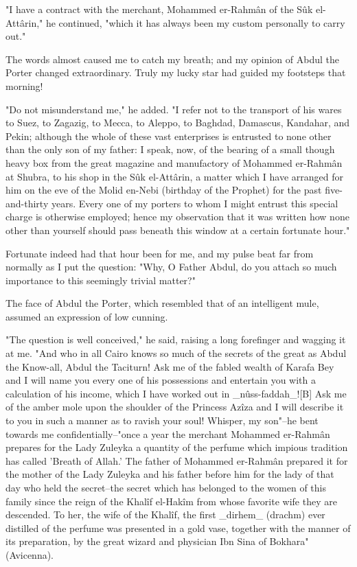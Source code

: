 "I have a contract with the merchant, Mohammed er-Rahmân of the Sûk
el-Attârin," he continued, "which it has always been my custom
personally to carry out."

The words almost caused me to catch my breath; and my opinion of Abdul
the Porter changed extraordinary. Truly my lucky star had guided my
footsteps that morning!

"Do not misunderstand me," he added. "I refer not to the transport of
his wares to Suez, to Zagazig, to Mecca, to Aleppo, to Baghdad,
Damascus, Kandahar, and Pekin; although the whole of these vast
enterprises is entrusted to none other than the only son of my father:
I speak, now, of the bearing of a small though heavy box from the
great magazine and manufactory of Mohammed er-Rahmân at Shubra, to his
shop in the Sûk el-Attârin, a matter which I have arranged for him on
the eve of the Molid en-Nebi (birthday of the Prophet) for the past
five-and-thirty years. Every one of my porters to whom I might entrust
this special charge is otherwise employed; hence my observation that
it was written how none other than yourself should pass beneath this
window at a certain fortunate hour."

Fortunate indeed had that hour been for me, and my pulse beat far from
normally as I put the question: "Why, O Father Abdul, do you attach so
much importance to this seemingly trivial matter?"

The face of Abdul the Porter, which resembled that of an intelligent
mule, assumed an expression of low cunning.

"The question is well conceived," he said, raising a long forefinger
and wagging it at me. "And who in all Cairo knows so much of the
secrets of the great as Abdul the Know-all, Abdul the Taciturn! Ask
me of the fabled wealth of Karafa Bey and I will name you every one
of his possessions and entertain you with a calculation of his income,
which I have worked out in _nûss-faddah_![B] Ask me of the amber mole
upon the shoulder of the Princess Azîza and I will describe it to you
in such a manner as to ravish your soul! Whisper, my son"--he bent
towards me confidentially--"once a year the merchant Mohammed
er-Rahmân prepares for the Lady Zuleyka a quantity of the perfume
which impious tradition has called 'Breath of Allah.' The father of
Mohammed er-Rahmân prepared it for the mother of the Lady Zuleyka and
his father before him for the lady of that day who held the
secret--the secret which has belonged to the women of this family
since the reign of the Khalîf el-Hakîm from whose favorite wife they
are descended. To her, the wife of the Khalîf, the first _dirhem_
(drachm) ever distilled of the perfume was presented in a gold vase,
together with the manner of its preparation, by the great wizard and
physician Ibn Sina of Bokhara" (Avicenna).


